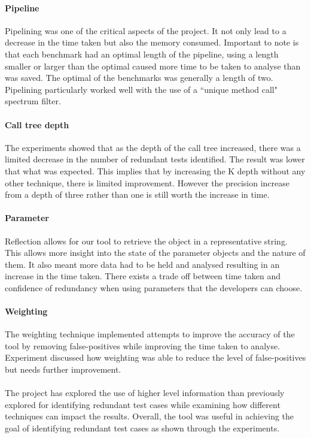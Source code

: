 \paragraph{Pipeline}
Pipelining was one of the critical aspects of the project. It not only lead to a decrease in the time taken but also the memory consumed. Important to note is that each benchmark had an optimal length of the pipeline, using a length smaller or larger than the optimal caused more time to be taken to analyse than was saved. The optimal of the benchmarks was generally a length of two. Pipelining particularly worked well with the use of a ``unique method call" spectrum filter.

\paragraph{Call tree depth}
The experiments showed that as the depth of the call tree increased, there was a limited decrease in the number of redundant tests identified. The result was lower that what was expected. This implies that by increasing the K depth without any other technique, there is limited improvement. However the precision increase from a depth of three rather than one is still worth the increase in time.

\paragraph{Parameter}
Reflection allows for our tool to retrieve the object in a representative string. This allows more insight into the state of the parameter objects and the nature of them. It also meant more data had to be held and analysed resulting in an increase in the time taken. There exists a trade off between time taken and confidence of redundancy when using parameters that the developers can choose. 

\paragraph{Weighting}
The weighting technique implemented attempts to improve the accuracy of the tool by removing false-positives while improving the time taken to analyse. Experiment  discussed how weighting was able to reduce the level of false-positives but needs further improvement.

\paragraph{}
The project has explored the use of higher level information than previously explored for identifying redundant test cases while examining how different techniques can impact the results. Overall, the tool was useful in achieving the goal of identifying redundant test cases as shown through the experiments. 


